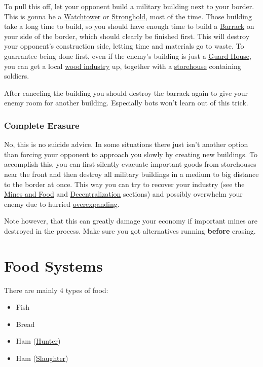 \documentclass[12pt]{article}
\begin{document}
To pull this off, let your opponent build a military building next to your border. This is gonna be a \hyperref[sec:watchtower]{Watchtower} or \hyperref[sec:stronghold]{Stronghold}, most of the time. Those building take a long time to build, so you should have enough time to build a \hyperref[sec:barrack]{Barrack} on your side of the border, which should clearly be finished first. This will destroy your opponent's construction side, letting time and materials go to waste. To guarrantee being done first, even if the enemy's building is just a \hyperref[sec:guardhouse]{Guard House}, you can get a local \hyperref[sec:woodindustry]{wood industry} up, together with a \hyperref[sec:storehouse]{storehouse} containing soldiers.

After canceling the building you should destroy the barrack again to give your enemy room for another building. Especially bots won't learn out of this trick.

\subsubsection{Complete Erasure}
\label{sec:completeerasure}

No, this is no suicide advice. In some situations there just isn't another option than forcing your opponent to approach you slowly by creating new buildings. To accomplish this, you can first silently evacuate important goods from storehouses near the front and then destroy all military buildings in a medium to big distance to the border at once. This way you can try to recover your industry (see the \hyperref[sec:minesandfoot]{Mines and Food} and \hyperref[sec:decentralization]{Decentralization} sections) and possibly overwhelm your enemy due to hurried \hyperref[sec:overexpansion]{overexpanding}.

Note however, that this can greatly damage your economy if important mines are destroyed in the process. Make sure you got alternatives running \textbf{before} erasing.

\section{Food Systems}
\label{sec:foodsystems}

There are mainly 4 types of food:

\begin{itemize}
  \item Fish
  \item Bread
  \item Ham (\hyperref[sec:hunter]{Hunter})
  \item Ham (\hyperref[sec:slaughterhouse]{Slaughter})
\end{itemize}
\end{document}
